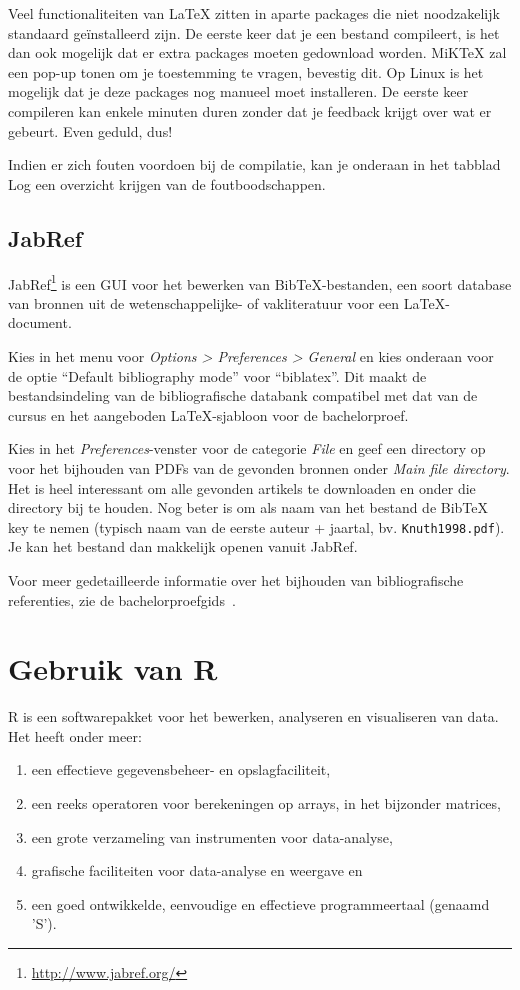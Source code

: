 Veel functionaliteiten van \LaTeX{} zitten in aparte packages die niet noodzakelijk standaard geïnstalleerd zijn. De eerste keer dat je een bestand compileert, is het dan ook mogelijk dat er extra packages moeten gedownload worden. MiK\TeX{} zal een pop-up tonen om je toestemming te vragen, bevestig dit. Op Linux is het mogelijk dat je deze packages nog manueel moet installeren. De eerste keer compileren kan enkele minuten duren zonder dat je feedback krijgt over wat er gebeurt. Even geduld, dus!

Indien er zich fouten voordoen bij de compilatie, kan je onderaan in het tabblad Log een overzicht krijgen van de foutboodschappen.

\subsection{JabRef}

JabRef\footnote{\url{http://www.jabref.org/}} is een GUI voor het bewerken van Bib\TeX{}-bestanden, een soort database van bronnen uit de wetenschappelijke- of vakliteratuur voor een \LaTeX{}-document.

Kies in het menu voor \emph{Options > Preferences > General} en kies onderaan voor de optie ``Default bibliography mode'' voor ``biblatex''. Dit maakt de bestandsindeling van de bibliografische databank compatibel met dat van de cursus en het aangeboden \LaTeX{}-sjabloon voor de bachelorproef.

Kies in het \emph{Preferences}-venster voor de categorie \emph{File} en geef een directory op voor het bijhouden van PDFs van de gevonden bronnen onder \emph{Main file directory}. Het is heel interessant om alle gevonden artikels te downloaden en onder die directory bij te houden. Nog beter is om als naam van het bestand de Bib\TeX{} key te nemen (typisch naam van de eerste auteur + jaartal, bv. \texttt{Knuth1998.pdf}). Je kan het bestand dan makkelijk openen vanuit JabRef.

Voor meer gedetailleerde informatie over het bijhouden van bibliografische referenties, zie de bachelorproefgids~\autocite{VanVreckem2017}.

\section{Gebruik van R}

R is een softwarepakket voor het bewerken, analyseren en visualiseren van data. Het heeft onder meer:

\begin{enumerate}
  \item een effectieve gegevensbeheer- en opslagfaciliteit,
  \item een reeks operatoren voor berekeningen op arrays, in het bijzonder matrices,
  \item een grote verzameling van instrumenten voor data-analyse,
  \item grafische faciliteiten voor data-analyse en weergave en
  \item een goed ontwikkelde, eenvoudige en effectieve programmeertaal (genaamd 'S').
\end{enumerate}


